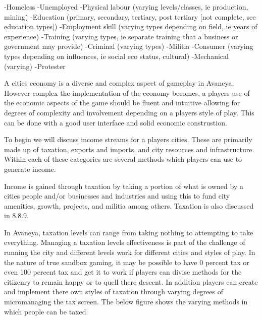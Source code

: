 -Homeless
-Unemployed
-Physical labour (varying levels/classes, ie production, mining)
-Education (primary, secondary, tertiary, post tertiary [not complete, see education types])
-Employment skill (varying types depending on field, ie years of experience)
-Training (varying types, ie separate training that a business or government may provide)
-Criminal (varying types)
-Militia
-Consumer (varying types depending on influences, ie social eco status, cultural)
-Mechanical (varying) 
-Protester





A cities economy is a diverse and complex aspect of gameplay in Avaneya. However complex the implementation of the economy becomes, a players use of the economic aspects of the game should be fluent and intuitive allowing for degrees of complexity and involvement depending on a players style of play. This can be done with a good user interface and solid economic construstion. 

To begin we will discuss income streams for a players cities. These are primarily made up of taxation, exports and imports, and city resources and infrastructure. Within each of these categories are several methods which players can use to generate income.


Income is gained through taxation by taking a portion of what is owned by a cities people and/or businesses and industries and using this to fund city amenities, growth, projects, and militia among others. Taxation is also discussed in 8.8.9.

In Avaneya, taxation levels can range from taking nothing to attempting to take everything. Managing a taxation levels effectiveness is part of the challenge of running the city and different levels work for different cities and styles of play. In the nature of true sandbox gaming, it may be possible to have 0 percent tax or even 100 percent tax and get it to work if players can divise methods for the citizenry to remain happy or to quell there descent. In addition players can create and implement there own styles of taxation through varying degrees of micromanaging the tax screen. The below figure shows the varying methods in which people can be taxed.

